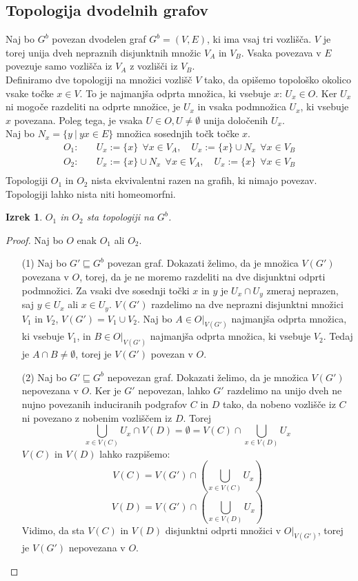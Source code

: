 \documentclass[mat1]{fmfdelo}
\newtheorem{theorem}{Izrek}[subsection]
\begin{document}
\subsection{Topologija dvodelnih grafov}
Naj bo $G^b$ povezan dvodelen graf $G^b = (V,E)$, ki ima vsaj tri vozlišča.
$V$ je torej unija dveh nepraznih disjunktnih množic $V_A$ in $V_B$. Vsaka
povezava v $E$ povezuje samo vozlišča iz $V_A$ z vozlišči iz $V_B$.\\
Definiramo dve topologiji na množici vozlišč $V$ tako, da opišemo
topološko okolico vsake točke $x \in V$. To je najmanjša odprta množica, ki
vsebuje $x$: $U_x \in O$. Ker $U_x$ ni mogoče razdeliti na odprte množice, je $U_x$
in vsaka podmnožica $U_x$, ki vsebuje $x$ povezana.
Poleg tega, je vsaka $U \in O, U \neq \emptyset$ unija določenih $U_x$.\\
Naj bo $N_x = \{y \  | \  yx \in E\}$ množica sosednjih točk točke $x$.\\
\[
  \begin{split}
  O_1:&\quad
  U_x:=\{x\}\ \ \forall x \in V_A, \quad
  U_x:=\{x\}\cup N_x\ \  \forall x \in V_B\\
  O_2:&\quad
  U_x:=\{x\}\cup N_x\ \  \forall x \in V_A, \quad
  U_x:=\{x\}\ \ \forall x \in V_B\\
\end{split}
\]
Topologiji $O_1$ in $O_2$ nista ekvivalentni razen na grafih, ki nimajo povezav.
Topologiji lahko nista niti homeomorfni.
\begin{theorem}
  $O_1$ in $O_2$ sta topologiji na $G^b$.
\end{theorem}
\begin{proof}
  Naj bo $O$ enak $O_1$ ali $O_2$.
  \begin{itemize}
    \item[(1)] Naj bo $G' \sqsubseteq G^b$ povezan graf. Dokazati želimo, da je
    množica $V(G')$ povezana v $O$, torej, da je ne moremo razdeliti na dve
    disjunktni odprti podmnožici. Za vsaki dve sosednji točki $x$ in $y$ je
    $U_x \cap U_y$ zmeraj neprazen, saj $y \in U_x$ ali $x \in U_y$. $V(G')$
    razdelimo na dve neprazni disjunktni množici $V_1$ in $V_2$,
    $V(G') = V_1 \cup V_2$. Naj bo $A \in O|_{V(G')}$
    najmanjša odprta množica, ki vsebuje $V_1$, in $B \in O|_{V(G')}$
    najmanjša odprta množica, ki vsebuje $V_2$. Tedaj je $A \cap B \neq \emptyset$,
    torej je $V(G')$ povezan v $O$.
    \item[(2)] Naj bo $G' \sqsubseteq G^b$ nepovezan graf. Dokazati želimo, da
    je množica $V(G')$ nepovezana v $O$. Ker je $G'$ nepovezan, lahko $G'$ razdelimo
    na unijo dveh ne nujno povezanih induciranih podgrafov $C$ in $D$ tako, da nobeno vozlišče iz $C$
    ni povezano z nobenim vozliščem iz $D$. Torej
    \[\bigcup_{x\in V(C)}U_x \cap V(D) = \emptyset = V(C) \cap \bigcup_{x\in V(D)}U_x\]
    $V(C)$ in $V(D)$ lahko razpišemo:
    \[V(C) = V(G') \cap \left(\bigcup_{x\in V(C)} U_x\right)\]
    \[V(D) = V(G') \cap \left(\bigcup_{x\in V(D)} U_x\right)\]
    Vidimo, da sta $V(C)$ in $V(D)$ disjunktni odprti množici v $O|_{V(G')}$,
    torej je $V(G')$ nepovezana v $O$.
  \end{itemize}
\end{proof}
\end{document}
